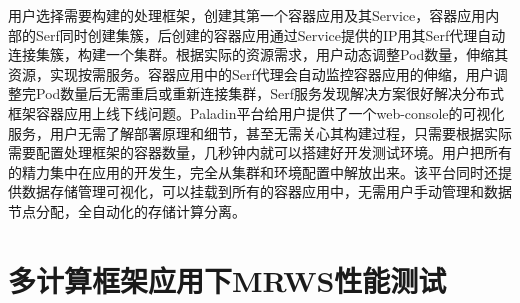用户选择需要构建的处理框架，创建其第一个容器应用及其Service，容器应用内部的Serf同时创建集簇，后创建的容器应用通过Service提供的IP用其Serf代理自动连接集簇，构建一个集群。根据实际的资源需求，用户动态调整Pod数量，伸缩其资源，实现按需服务。容器应用中的Serf代理会自动监控容器应用的伸缩，用户调整完Pod数量后无需重启或重新连接集群，Serf服务发现解决方案很好解决分布式框架容器应用上线下线问题。Paladin平台给用户提供了一个web-console的可视化服务，用户无需了解部署原理和细节，甚至无需关心其构建过程，只需要根据实际需要配置处理框架的容器数量，几秒钟内就可以搭建好开发测试环境。用户把所有的精力集中在应用的开发生，完全从集群和环境配置中解放出来。该平台同时还提供数据存储管理可视化，可以挂载到所有的容器应用中，无需用户手动管理和数据节点分配，全自动化的存储计算分离。

\section{多计算框架应用下MRWS性能测试}


























